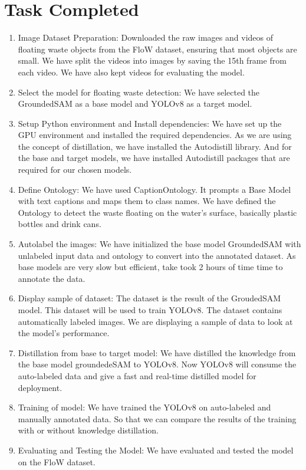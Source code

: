 \section{Task Completed}
\begin{enumerate}
    \item Image Dataset Preparation: 
    Downloaded the raw images and videos of floating waste objects from the FloW dataset, ensuring that most objects are small. We have split the videos into images by saving the 15th frame from each video. We have also kept videos for evaluating the model.

\item Select the model for floating waste detection:
We have selected the GroundedSAM as a base model and YOLOv8 as a target model.


\item Setup Python environment and Install dependencies: We have set up the GPU environment and installed the required dependencies. As we are using the concept of distillation, we have installed the Autodistill library. And for the base and target models, we have installed Autodistill packages that are required for our chosen models.


\item Define Ontology: 
We have used CaptionOntology. It prompts a Base Model with text captions and maps them to class names. We have defined the Ontology to detect the waste floating on the water's surface, basically plastic bottles and drink cans.


\item Autolabel the images:
We have initialized the base model GroundedSAM with unlabeled input data and ontology to convert into the annotated dataset. As base models are very slow but efficient, take took 2 hours of time time to annotate the data.


\item Display sample of dataset:
The dataset is the result of the GroudedSAM model. This dataset will be used to train YOLOv8. The dataset contains automatically labeled images. We are displaying a sample of data to look at the model's performance.

\item Distillation from base to target model:
We have distilled the knowledge from the base model groundedeSAM to YOLOv8. Now YOLOv8 will consume the auto-labeled data and give a fast and real-time distilled model for deployment.

\item Training of model: 
We have trained the YOLOv8 on auto-labeled and manually annotated data. So that we can compare the results of the training with or without knowledge distillation.

\item Evaluating and Testing the Model:
We have evaluated and tested the model on the FloW dataset.

\end{enumerate}

